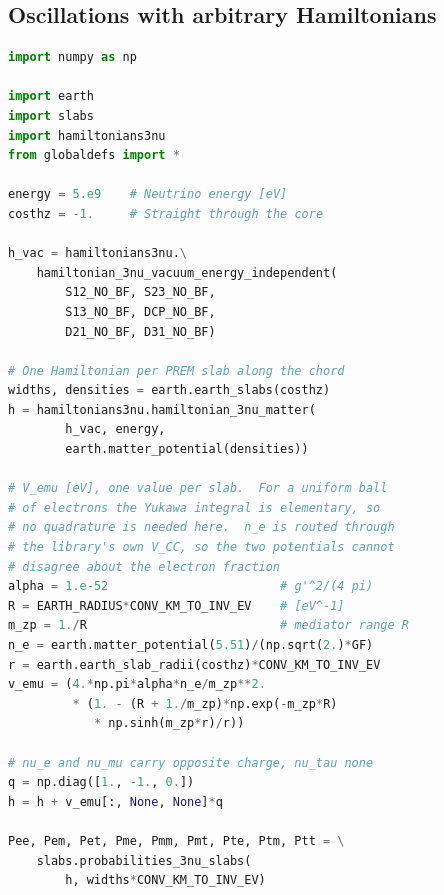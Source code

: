 \documentclass[final,5p,times,twocolumn,sort,compress]{elsarticle}
\newcommand{\eq}{Eq.}
\newcommand{\fig}{Fig.}
\newcommand{\equ}[1]{\eq~(\ref{equ:#1})}
\newcommand{\figu}[1]{\fig~\ref{fig:#1}}
\begin{document}

\subsection{Oscillations with arbitrary Hamiltonians}
\label{sec:arbitrary_hamiltonian}

\begin{lstlisting}[language=Python, caption={Using {\tt NuOscProbExact} with an arbitrary, user-supplied Hamiltonian, here a long-range $L_e - L_\mu$ interaction sourced by the electrons of the Earth.  The chord and $V_{\rm CC}$ follow PREM; only the source of $V_{e\mu}$ is idealized to a uniform ball, which is what puts \equ{yukawa} in closed form at any mediator mass and spares the quadrature.  Notebook 20 evaluates \equ{yukawa_radial} for the PREM distribution instead, checks the two against each other, and is what \figu{lri_earth} is drawn from.  What the new interaction costs the user is the last two lines.}, label={lst:3nu_arbitrary}, float=t]
import numpy as np

import earth
import slabs
import hamiltonians3nu
from globaldefs import *

energy = 5.e9    # Neutrino energy [eV]
costhz = -1.     # Straight through the core

h_vac = hamiltonians3nu.\
    hamiltonian_3nu_vacuum_energy_independent(
        S12_NO_BF, S23_NO_BF,
        S13_NO_BF, DCP_NO_BF,
        D21_NO_BF, D31_NO_BF)

# One Hamiltonian per PREM slab along the chord
widths, densities = earth.earth_slabs(costhz)
h = hamiltonians3nu.hamiltonian_3nu_matter(
        h_vac, energy,
        earth.matter_potential(densities))

# V_emu [eV], one value per slab.  For a uniform ball
# of electrons the Yukawa integral is elementary, so
# no quadrature is needed here.  n_e is routed through
# the library's own V_CC, so the two potentials cannot
# disagree about the electron fraction
alpha = 1.e-52                        # g'^2/(4 pi)
R = EARTH_RADIUS*CONV_KM_TO_INV_EV    # [eV^-1]
m_zp = 1./R                           # mediator range R
n_e = earth.matter_potential(5.51)/(np.sqrt(2.)*GF)
r = earth.earth_slab_radii(costhz)*CONV_KM_TO_INV_EV
v_emu = (4.*np.pi*alpha*n_e/m_zp**2.
         * (1. - (R + 1./m_zp)*np.exp(-m_zp*R)
            * np.sinh(m_zp*r)/r))

# nu_e and nu_mu carry opposite charge, nu_tau none
q = np.diag([1., -1., 0.])
h = h + v_emu[:, None, None]*q

Pee, Pem, Pet, Pme, Pmm, Pmt, Pte, Ptm, Ptt = \
    slabs.probabilities_3nu_slabs(
        h, widths*CONV_KM_TO_INV_EV)
\end{lstlisting}
\end{document}
